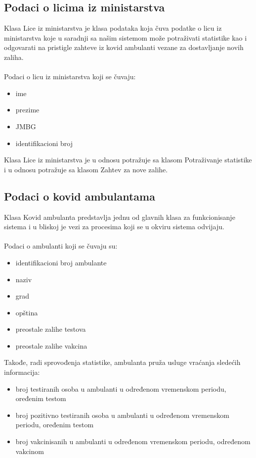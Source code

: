 \documentclass[titlepage]{article}
\begin{document}
\subsection{Podaci o licima iz ministarstva}

Klasa Lice iz ministarstva je klasa podataka koja \v{c}uva podatke o licu iz ministarstva koje u saradnji sa na\v{s}im sistemom mo\v{z}e potra\v{z}ivati statistike kao i odgovarati na pristigle zahteve iz kovid ambulanti vezane za dostavljanje novih zaliha.
\\~\\
Podaci o licu iz ministarstva koji se \v{c}uvaju:
\begin{itemize}
    \item ime
    \item prezime
    \item JMBG
    \item identifikacioni broj
\end{itemize}

Klasa Lice iz ministarstva je u odnosu potra\v{z}uje sa klasom  Potra\v{z}ivanje statistike i u odnosu potra\v{z}uje  sa klasom Zahtev za nove zalihe.

\subsection{Podaci o kovid ambulantama}

Klasa Kovid ambulanta predstavlja jednu od glavnih klasa za funkcionisanje sistema i u bliskoj je vezi za procesima koji se u okviru sistema odvijaju.\\ \\
Podaci o ambulanti koji se čuvaju su:

\begin{itemize}
    \item identifikacioni broj ambulante
    \item naziv
    \item grad
    \item opština
    \item preostale zalihe testova
    \item preostale zalihe vakcina
\end{itemize}

Takođe, radi sprovođenja statistike, ambulanta pruža usluge vraćanja sledećih informacija:

\begin{itemize}
    \item broj testiranih osoba u ambulanti u određenom vremenskom periodu, oređenim testom
    \item broj pozitivno testiranih osoba u ambulanti u određenom vremenskom periodu, oređenim testom
    \item broj vakcinisanih u ambulanti u određenom vremenskom periodu, određenom vakcinom
\end{itemize}
\end{document}
